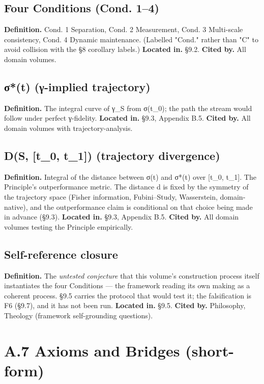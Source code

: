 \documentclass[11pt, openany]{book}
\newcommand{\sectionbreak}{\clearpage}
\begin{document}
\subsection{Four Conditions (Cond. 1–4)}
\textbf{Definition.} Cond. 1 Separation, Cond. 2 Measurement, Cond. 3 Multi-scale consistency, Cond. 4 Dynamic maintenance. (Labelled "Cond." rather than "C" to avoid collision with the §8 corollary labels.)
\textbf{Located in.} §9.2.
\textbf{Cited by.} All domain volumes.

\subsection{σ*(t) (γ-implied trajectory)}
\textbf{Definition.} The integral curve of γ\_\allowbreak{}S from σ(t\_\allowbreak{}0); the path the stream would follow under perfect γ-fidelity.
\textbf{Located in.} §9.3, Appendix B.5.
\textbf{Cited by.} All domain volumes with trajectory-analysis.

\subsection{D(S, [t\_\allowbreak{}0, t\_\allowbreak{}1]) (trajectory divergence)}
\textbf{Definition.} Integral of the distance between σ(t) and σ*(t) over [t\_\allowbreak{}0, t\_\allowbreak{}1]. The Principle's outperformance metric. The distance d is fixed by the symmetry of the trajectory space (Fisher information, Fubini–Study, Wasserstein, domain-native), and the outperformance claim is conditional on that choice being made in advance (§9.3).
\textbf{Located in.} §9.3, Appendix B.5.
\textbf{Cited by.} All domain volumes testing the Principle empirically.

\subsection{Self-reference closure}
\textbf{Definition.} The \textit{untested conjecture} that this volume's construction process itself instantiates the four Conditions --- the framework reading its own making as a coherent process. §9.5 carries the protocol that would test it; the falsification is F6 (§9.7), and it has not been run.
\textbf{Located in.} §9.5.
\textbf{Cited by.} Philosophy, Theology (framework self-grounding questions).

\sectionbreak

\section{A.7 Axioms and Bridges (short-form)}
\end{document}

